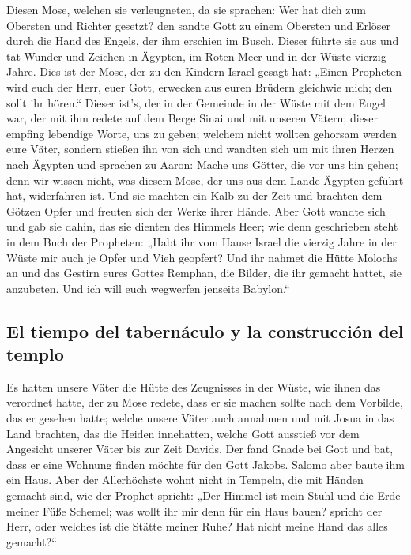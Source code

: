  Diesen Mose, welchen sie verleugneten, da sie sprachen:
Wer hat dich zum Obersten und Richter gesetzt? den sandte Gott zu einem
Obersten und Erlöser durch die Hand des Engels, der ihm erschien im
Busch.  Dieser führte sie aus und tat Wunder und Zeichen
in Ägypten, im Roten Meer und in der Wüste vierzig Jahre.
 Dies ist der Mose, der zu den Kindern Israel gesagt hat:
„Einen Propheten wird euch der Herr, euer Gott, erwecken aus euren
Brüdern gleichwie mich; den sollt ihr hören.``  Dieser
ist's, der in der Gemeinde in der Wüste mit dem Engel war, der mit ihm
redete auf dem Berge Sinai und mit unseren Vätern; dieser empfing
lebendige Worte, uns zu geben;  welchem nicht wollten
gehorsam werden eure Väter, sondern stießen ihn von sich und wandten
sich um mit ihren Herzen nach Ägypten  und sprachen zu
Aaron: Mache uns Götter, die vor uns hin gehen; denn wir wissen nicht,
was diesem Mose, der uns aus dem Lande Ägypten geführt hat, widerfahren
ist.  Und sie machten ein Kalb zu der Zeit und brachten
dem Götzen Opfer und freuten sich der Werke ihrer Hände. 
Aber Gott wandte sich und gab sie dahin, das sie dienten des Himmels
Heer; wie denn geschrieben steht in dem Buch der Propheten: „Habt ihr
vom Hause Israel die vierzig Jahre in der Wüste mir auch je Opfer und
Vieh geopfert?  Und ihr nahmet die Hütte Molochs an und
das Gestirn eures Gottes Remphan, die Bilder, die ihr gemacht hattet,
sie anzubeten. Und ich will euch wegwerfen jenseits Babylon.``

\hypertarget{el-tiempo-del-tabernuxe1culo-y-la-construcciuxf3n-del-templo}{%
\subsection{El tiempo del tabernáculo y la construcción del
templo}\label{el-tiempo-del-tabernuxe1culo-y-la-construcciuxf3n-del-templo}}

 Es hatten unsere Väter die Hütte des Zeugnisses in der
Wüste, wie ihnen das verordnet hatte, der zu Mose redete, dass er sie
machen sollte nach dem Vorbilde, das er gesehen hatte; 
welche unsere Väter auch annahmen und mit Josua in das Land brachten,
das die Heiden innehatten, welche Gott ausstieß vor dem Angesicht
unserer Väter bis zur Zeit Davids.  Der fand Gnade bei
Gott und bat, dass er eine Wohnung finden möchte für den Gott Jakobs.
 Salomo aber baute ihm ein Haus.  Aber der
Allerhöchste wohnt nicht in Tempeln, die mit Händen gemacht sind, wie
der Prophet spricht:  „Der Himmel ist mein Stuhl und die
Erde meiner Füße Schemel; was wollt ihr mir denn für ein Haus bauen?
spricht der Herr, oder welches ist die Stätte meiner Ruhe?
 Hat nicht meine Hand das alles gemacht?{}``

